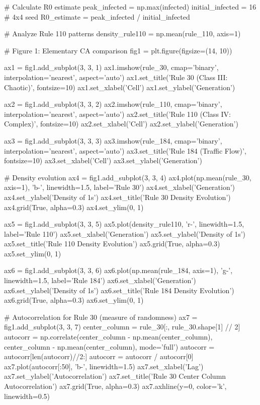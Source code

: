 \documentclass[a4paper, 11pt]{article}
\begin{document}
\begin{pycode}
# Calculate R0 estimate
peak_infected = np.max(infected)
initial_infected = 16  # 4x4 seed
R0_estimate = peak_infected / initial_infected

# Analyze Rule 110 patterns
density_rule110 = np.mean(rule_110, axis=1)

# Figure 1: Elementary CA comparison
fig1 = plt.figure(figsize=(14, 10))

ax1 = fig1.add_subplot(3, 3, 1)
ax1.imshow(rule_30, cmap='binary', interpolation='nearest', aspect='auto')
ax1.set_title('Rule 30 (Class III: Chaotic)', fontsize=10)
ax1.set_xlabel('Cell')
ax1.set_ylabel('Generation')

ax2 = fig1.add_subplot(3, 3, 2)
ax2.imshow(rule_110, cmap='binary', interpolation='nearest', aspect='auto')
ax2.set_title('Rule 110 (Class IV: Complex)', fontsize=10)
ax2.set_xlabel('Cell')
ax2.set_ylabel('Generation')

ax3 = fig1.add_subplot(3, 3, 3)
ax3.imshow(rule_184, cmap='binary', interpolation='nearest', aspect='auto')
ax3.set_title('Rule 184 (Traffic Flow)', fontsize=10)
ax3.set_xlabel('Cell')
ax3.set_ylabel('Generation')

# Density evolution
ax4 = fig1.add_subplot(3, 3, 4)
ax4.plot(np.mean(rule_30, axis=1), 'b-', linewidth=1.5, label='Rule 30')
ax4.set_xlabel('Generation')
ax4.set_ylabel('Density of 1s')
ax4.set_title('Rule 30 Density Evolution')
ax4.grid(True, alpha=0.3)
ax4.set_ylim(0, 1)

ax5 = fig1.add_subplot(3, 3, 5)
ax5.plot(density_rule110, 'r-', linewidth=1.5, label='Rule 110')
ax5.set_xlabel('Generation')
ax5.set_ylabel('Density of 1s')
ax5.set_title('Rule 110 Density Evolution')
ax5.grid(True, alpha=0.3)
ax5.set_ylim(0, 1)

ax6 = fig1.add_subplot(3, 3, 6)
ax6.plot(np.mean(rule_184, axis=1), 'g-', linewidth=1.5, label='Rule 184')
ax6.set_xlabel('Generation')
ax6.set_ylabel('Density of 1s')
ax6.set_title('Rule 184 Density Evolution')
ax6.grid(True, alpha=0.3)
ax6.set_ylim(0, 1)

# Autocorrelation for Rule 30 (measure of randomness)
ax7 = fig1.add_subplot(3, 3, 7)
center_column = rule_30[:, rule_30.shape[1] // 2]
autocorr = np.correlate(center_column - np.mean(center_column),
                       center_column - np.mean(center_column), mode='full')
autocorr = autocorr[len(autocorr)//2:]
autocorr = autocorr / autocorr[0]
ax7.plot(autocorr[:50], 'b-', linewidth=1.5)
ax7.set_xlabel('Lag')
ax7.set_ylabel('Autocorrelation')
ax7.set_title('Rule 30 Center Column Autocorrelation')
ax7.grid(True, alpha=0.3)
ax7.axhline(y=0, color='k', linewidth=0.5)


\end{pycode}
\end{document}
